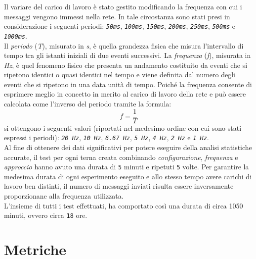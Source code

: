\noindent Il variare del carico di lavoro è stato gestito modificando la frequenza con cui i messaggi vengono immessi nella rete.
In tale circostanza sono stati presi in considerazione i seguenti periodi: \texttt{\textit{50ms}}, \texttt{\textit{100ms}}, \texttt{\textit{150ms}}, \texttt{\textit{200ms}}, \texttt{\textit{250ms}}, \texttt{\textit{500ms}} e \texttt{\textit{1000ms}}.\\
Il \textit{periodo} (\textit{T}), misurato in \textit{s}, è quella grandezza fisica che misura l'intervallo di tempo tra gli istanti iniziali di due eventi successivi.
La \textit{frequenza} (\textit{f}), misurata in \textit{Hz}, è quel fenomeno fisico che presenta un andamento costituito da eventi che si ripetono identici o quasi identici nel tempo e viene definita dal numero degli eventi che si ripetono in una data unità di tempo. Poiché la frequenza consente di esprimere meglio in concetto in merito al carico di lavoro della rete e può essere calcolata come l'inverso del periodo tramite la formula:
$$ f = \frac{1}{T} $$
si ottengono i seguenti valori (riportati nel medesimo ordine con cui sono stati espressi i periodi): \texttt{\textit{20 Hz}}, \texttt{\textit{10 Hz}}, \texttt{\textit{6.67 Hz}}, \texttt{\textit{5 Hz}}, \texttt{\textit{4 Hz}}, \texttt{\textit{2 Hz}} e \texttt{\textit{1 Hz}}.\\


\noindent Al fine di ottenere dei dati significativi per potere eseguire della analisi statistiche accurate, il test per ogni terna creata combinando \textit{configurazione}, \textit{frequenza} e \textit{approccio} hanno avuto una durata di \texttt{5} minuti e ripetuti \texttt{5} volte. Per garantire la medesima durata di ogni esperimento eseguito e allo stesso tempo avere carichi di lavoro ben distinti, il numero di messaggi inviati risulta essere inversamente proporzionane alla frequenza utilizzata.\\

\noindent L'insieme di tutti i test effettuati, ha comportato così una durata di circa 1050 minuti, ovvero circa \texttt{18} ore.

\section{Metriche}

